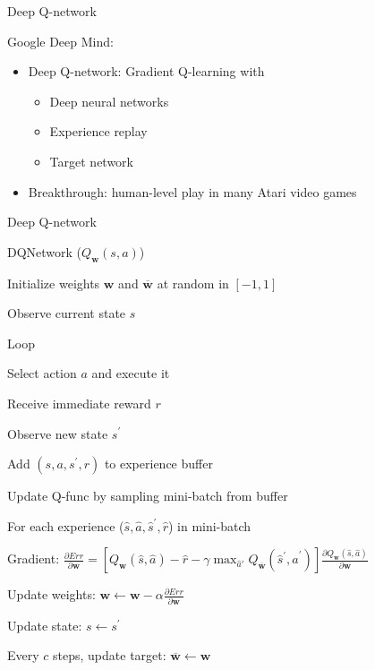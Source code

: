 \documentclass[11pt,table]{beamer}
\begin{document}
\begin{frame}{Deep Q-network}

Google Deep Mind:\\[2ex]
\begin{itemize}
\item Deep Q-network: Gradient Q-learning with

 \begin{itemize}
     \item Deep neural networks
\item Experience replay
\item Target network\\[2ex]
 
 \end{itemize}
 \item Breakthrough: human-level play in many Atari  video games
 
\end{itemize}
    
\end{frame}

\begin{frame}{Deep Q-network}
\begin{tcolorbox}[colframe=black, boxrule=1pt, sharp corners]

\textcolor{red1}{DQNetwork ($Q_{\boldsymbol{w}}(s,a)$)}

Initialize weights $\boldsymbol{w}$ and $\overline{\boldsymbol{w}}$ at random in $[-1,1]$

Observe current state $s$

\quad Loop

\qquad Select action $a$ and execute it

\qquad Receive immediate reward $r$

\qquad Observe new state $s^{\prime}$

\qquad Add $\left(s, a, s^{\prime}, r\right)$ to \textcolor{red1}{experience buffer}

\qquad Update Q-func by sampling mini-batch from buffer

\qquad For each experience ($\hat{s}, \hat{a}, \hat{s}^{\prime}, \hat{r}$) in mini-batch

\quad\qquad Gradient: $\frac{\partial E r r}{\partial \boldsymbol{w}}=\left[Q_{\boldsymbol{w}}(\hat{s}, \hat{a})-\hat{r}-\gamma \max _{\widehat{a} \prime} Q_{\overline{\boldsymbol{w}}}\left(\hat{s}^{\prime}, \hat{a}^{\prime}\right)\right] \frac{\partial Q_{\boldsymbol{w}}(\hat{s}, \hat{a})}{\partial \boldsymbol{w}}$

\quad\qquad Update weights: $\boldsymbol{w} \leftarrow \boldsymbol{w}-\alpha \frac{\partial E r r}{\partial \boldsymbol{w}}$

\qquad Update state: $s \leftarrow s^{\prime}$

\qquad Every $c$ steps, update \textcolor{red1}{target}: \textcolor{red1}{$\overline{\boldsymbol{w}} \leftarrow \boldsymbol{w}$}

    \end{tcolorbox}
\end{frame}
\end{document}
